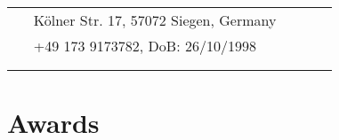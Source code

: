 \documentclass[10pt]{article} %
\begin{document}
\begin{paracol}{2}
\parbox[top][0.12\textheight][c]{\linewidth}{ %
	\vspace{-0.04\textheight} %
	\colorbox{shade}{ %
		\begin{supertabular}{p{0.05\linewidth}|p{0.795\linewidth}} %
            \raisebox{-1pt}{\faHome} & K\"{o}lner Str. 17, 57072 Siegen, Germany \\ %
			\raisebox{-1pt}{\faPhone} & +49 173 9173782, DoB: 26/10/1998 \\ %
            \raisebox{0pt}{\small\faEnvelope} & \\%
            \raisebox{0pt}{\faGithub} & \\ %
		\end{supertabular}
	}
}


\section{Awards}




\end{paracol}
\end{document}
